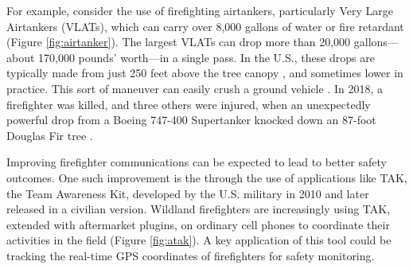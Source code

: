 \documentclass[]             %
{NASA}                       %
\theoremstyle{definition}
\begin{document}
For example, consider the use of firefighting airtankers, particularly
Very Large Airtankers (VLATs), which can carry over 8,000 gallons of
water or fire retardant \cite{2019:airtankerops}
(Figure \ref{fig:airtanker}). The largest VLATs can drop more than
20,000 gallons---about 170,000 pounds' worth---in a single pass. In
the U.S., these drops are typically made from just 250 feet above the
tree canopy \cite{2019:airtankerops}, and sometimes lower in
practice. This sort of maneuver can easily crush a ground vehicle
\cite{2019:stickney}. In 2018, a firefighter was killed, and three
others were injured, when an unexpectedly powerful drop from a Boeing
747-400 Supertanker knocked down an 87-foot Douglas Fir tree
\cite{2018:calfire}.

Improving firefighter communications can be expected to lead to better
safety outcomes. One such improvement is the through the use of
applications like TAK, the Team Awareness Kit, developed by the
U.S. military in 2010 and later released in a civilian
version. Wildland firefighters are increasingly using TAK, extended
with aftermarket plugins, on ordinary cell phones to coordinate their
activities in the field (Figure \ref{fig:atak}). A key application of
this tool could be tracking the real-time GPS coordinates of
firefighters for safety monitoring.
\end{document}
